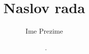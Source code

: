 \documentclass[botnum,a4paper,11,oneside,final]{tex_aux/rithesis}
\begin{document}
\frontmatter   %



\title{Naslov rada}   %

\date{\MONTH~\the\year.}   %

\author{Ime Prezime}  %
\maketitle		%



\maketitleabstract

\begin{assignmentpage}
\end{assignmentpage}

\begin{honestystatementpage}
    
\end{honestystatementpage}

\begin{acknowledgments} %
      
\end{acknowledgments}

\renewcommand{\baselinestretch}{1}\normalsize
\tableofcontents
\listoffigures
\listoftables
\renewcommand{\baselinestretch}{1.2}\normalsize

\mainmatter		%
\end{document}
